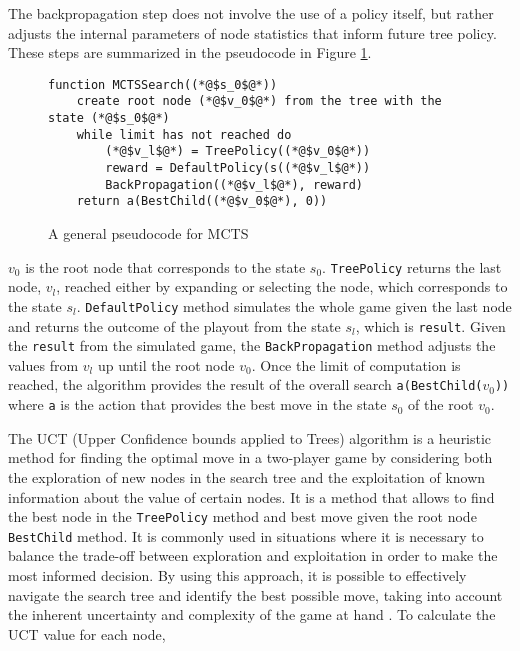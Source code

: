 The backpropagation step does not involve the use of a policy itself, but rather adjusts the internal parameters of node statistics that inform future tree policy. These steps are summarized in the pseudocode in Figure \ref{fig:mctsGeneral}.


\begin{figure}[h]
\captionsetup{justification=centering}
\begin{lstlisting}
function MCTSSearch((*@$s_0$@*))
	create root node (*@$v_0$@*) from the tree with the state (*@$s_0$@*)
	while limit has not reached do
		(*@$v_l$@*) = TreePolicy((*@$v_0$@*))
		reward = DefaultPolicy(s((*@$v_l$@*))
		BackPropagation((*@$v_l$@*), reward)
	return a(BestChild((*@$v_0$@*), 0))
\end{lstlisting}
\caption{A general pseudocode for MCTS}
\label{fig:mctsGeneral}
\end{figure}

$v_0$ is the root node that corresponds to the state $s_0$. \texttt{TreePolicy} returns the last node, $v_l$, reached either by expanding or selecting the node, which corresponds to the state $s_l$. \texttt{DefaultPolicy} method simulates the whole game given the last node and returns the outcome of the playout from the state $s_l$, which is \texttt{result}. Given the \texttt{result} from the simulated game, the \texttt{BackPropagation} method adjusts the values from $v_l$ up until the root node $v_0$. Once the limit of computation is reached, the algorithm provides the result of the overall search \texttt{a(BestChild($v_0$))} where \texttt{a} is the action that provides the best move in the state $s_0$ of the root $v_0$.

The UCT (Upper Confidence bounds applied to Trees) algorithm is a heuristic method for finding the optimal move in a two-player game by considering both the exploration of new nodes in the search tree and the exploitation of known information about the value of certain nodes. It is a method that allows to find the best node in the \texttt{TreePolicy} method and best move given the root node \texttt{BestChild} method. It is commonly used in situations where it is necessary to balance the trade-off between exploration and exploitation in order to make the most informed decision. By using this approach, it is possible to effectively navigate the search tree and identify the best possible move, taking into account the inherent uncertainty and complexity of the game at hand \citep{MCTSSurvey}. To calculate the UCT value for each node, 

